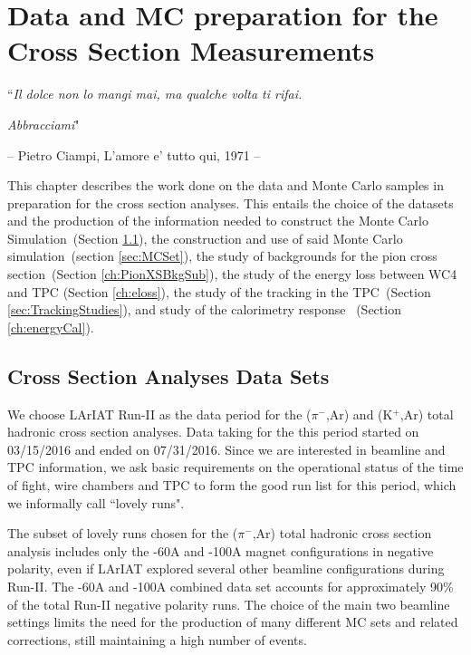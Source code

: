 \chapter{Data and MC preparation for the Cross Section Measurements}\label{ch:samples}
{\raggedleft ``\emph{Il dolce non lo mangi mai, ma qualche volta ti rifai.} \par}
{\raggedleft \emph{Abbracciami}"\par}
{\raggedleft -- Pietro Ciampi, L'amore e' tutto qui, 1971 -- \par}
\vspace{0.5cm}



This chapter describes the  work done on the  data and Monte Carlo samples in preparation for the cross section analyses. 
This entails the choice of the datasets and the production of the information needed to construct the Monte Carlo Simulation~(Section  \ref{sec:dataSet}),  the construction and use of said Monte Carlo simulation~(section \ref{sec:MCSet}), the study of backgrounds for the pion cross section~(Section  \ref{ch:PionXSBkgSub}), the study of the energy loss between WC4 and TPC (Section \ref{ch:eloss}), the study of the tracking in the TPC~(Section  \ref{sec:TrackingStudies}), and study of  the calorimetry response ~(Section  \ref{ch:energyCal}). 


\section{Cross Section Analyses Data Sets}\label{sec:dataSet}
We choose LArIAT Run-II as the data period for the  ($\pi^{-}$,Ar) and (K$^{+}$,Ar) total hadronic cross section analyses. 
Data taking for the this period started on 03/15/2016  and ended on 07/31/2016. 
Since we are interested in beamline and TPC information, we ask basic requirements on the operational status of the time of fight, wire chambers and TPC to form the good run list for this period, which we informally call ``lovely runs".

The subset of lovely runs  chosen for the  ($\pi^{-}$,Ar) total hadronic cross section analysis includes only the -60A and -100A magnet configurations in negative polarity, even if LArIAT explored several other beamline configurations during Run-II. The -60A and -100A combined data set accounts for approximately 90\% of the total Run-II negative polarity runs.   The  choice of the main two beamline settings limits the need for the production of many different MC sets and related corrections, still maintaining a high number of events. 

